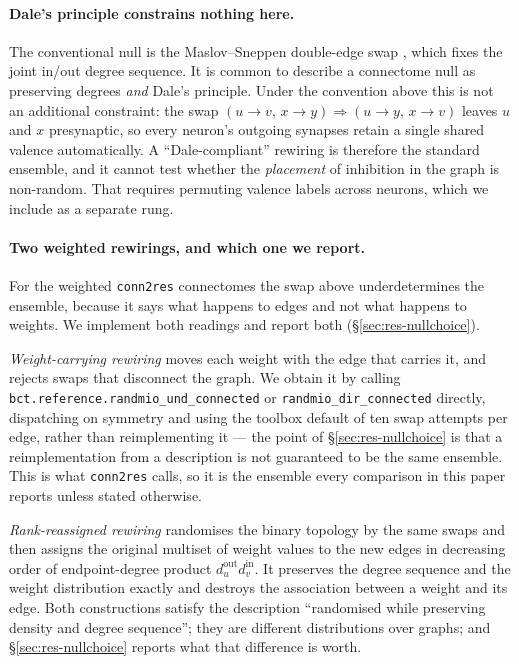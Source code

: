 \paragraph{Dale's principle constrains nothing here.}
The conventional null is the Maslov--Sneppen double-edge swap
\cite{maslov2002specificity}, which fixes the joint in/out degree sequence. It is
common to describe a connectome null as preserving degrees \emph{and} Dale's
principle. Under the convention above this is not an additional constraint: the swap
$(u\to v,\, x\to y) \Rightarrow (u\to y,\, x\to v)$ leaves $u$ and $x$ presynaptic,
so every neuron's outgoing synapses retain a single shared valence automatically.
A ``Dale-compliant'' rewiring is therefore the standard ensemble, and it cannot test
whether the \emph{placement} of inhibition in the graph is non-random. That requires
permuting valence labels across neurons, which we include as a separate rung.

\paragraph{Two weighted rewirings, and which one we report.}
For the weighted \texttt{conn2res} connectomes the swap above underdetermines the
ensemble, because it says what happens to edges and not what happens to weights. We
implement both readings and report both (\S\ref{sec:res-nullchoice}).

\emph{Weight-carrying rewiring} moves each weight with the edge that carries it, and
rejects swaps that disconnect the graph. We obtain it by calling
\texttt{bct.reference.randmio\_und\_connected} or \texttt{randmio\_dir\_connected}
\cite{rubinov2010complex} directly, dispatching on symmetry and using the toolbox default
of ten swap attempts per edge, rather than reimplementing it --- the point of
\S\ref{sec:res-nullchoice} is that a reimplementation from a description is not
guaranteed to be the same ensemble. This is what \texttt{conn2res} calls, so it is the
ensemble every comparison in this paper reports unless stated otherwise.

\emph{Rank-reassigned rewiring} randomises the binary topology by the same swaps and then
assigns the original multiset of weight values to the new edges in decreasing order of
endpoint-degree product $d^{\mathrm{out}}_u d^{\mathrm{in}}_v$. It preserves the degree
sequence and the weight distribution exactly and destroys the association between a
weight and its edge. Both constructions satisfy the description ``randomised while
preserving density and degree sequence''; they are different distributions over graphs;
and \S\ref{sec:res-nullchoice} reports what that difference is worth.

